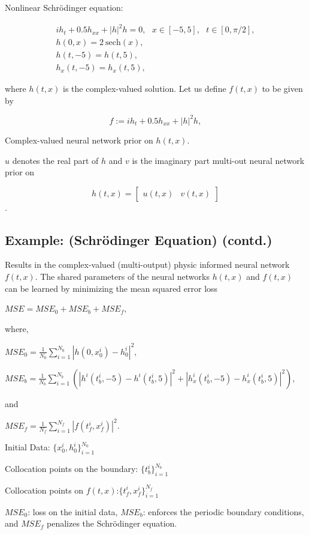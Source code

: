 \documentclass[book.tex]{subfiles}
\begin{document}
Nonlinear Schrödinger equation:

\[
\begin{array}{l}
i h_t + 0.5 h_{xx} + |h|^2 h = 0,\ \ \ x \in [-5, 5],\ \ \ t \in [0, \pi/2],\\
h(0,x) = 2\ \text{sech}(x),\\
h(t,-5) = h(t, 5),\\
h_x(t,-5) = h_x(t, 5),
\end{array}
\]

where $h(t,x)$ is the complex-valued solution. Let us define $f(t,x)$ to
be given by

\[
f := i h_t + 0.5 h_{xx} + |h|^2 h,
\]

Complex-valued neural network prior on $h(t,x)$.

$u$ denotes the real part of $h$ and $v$ is the imaginary part multi-out
neural network prior on

\[h(t,x) = \begin{bmatrix}
u(t,x) & v(t,x)
\end{bmatrix}\].

\subsection{Example: (Schrödinger Equation)
(contd.)}\label{example-shruxf6dinger-equation-contd.}

Results in the complex-valued (multi-output) physic informed neural
network $f(t,x)$. The shared parameters of the neural networks $h(t,x)$
and $f(t,x)$ can be learned by minimizing the mean squared error loss

$MSE = MSE_0 + MSE_b + MSE_f,$

where,

$MSE_0 = \frac{1}{N_0}\sum_{i=1}^{N_0} |h(0,x_0^i) - h^i_0|^2,$

$MSE_b = \frac{1}{N_b}\sum_{i=1}^{N_b} \left(|h^i(t^i_b,-5) - h^i(t^i_b,5)|^2 + |h^i_x(t^i_b,-5) - h^i_x(t^i_b,5)|^2\right),$

and

$MSE_f = \frac{1}{N_f}\sum_{i=1}^{N_f}|f(t_f^i,x_f^i)|^2.$

Initial Data: $\{x_0^i, h^i_0\}_{i=1}^{N_0}$

Collocation points on the boundary: $\{t^i_b\}_{i=1}^{N_b}$

Collocation points on $f(t,x)$:$\{t_f^i,x_f^i\}_{i=1}^{N_f}$

$MSE_0$: loss on the initial data, $MSE_b$: enforces the periodic
boundary conditions, and $MSE_f$ penalizes the Schrödinger equation.
\end{document}
